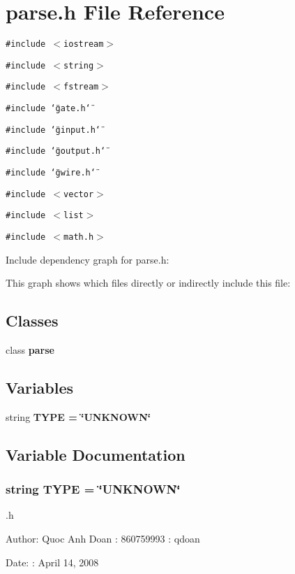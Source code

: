 \section{parse.h File Reference}
\label{parse_8h}
{\tt \#include $<$iostream$>$}\par
{\tt \#include $<$string$>$}\par
{\tt \#include $<$fstream$>$}\par
{\tt \#include \char`\"{}gate.h\char`\"{}}\par
{\tt \#include \char`\"{}ginput.h\char`\"{}}\par
{\tt \#include \char`\"{}goutput.h\char`\"{}}\par
{\tt \#include \char`\"{}gwire.h\char`\"{}}\par
{\tt \#include $<$vector$>$}\par
{\tt \#include $<$list$>$}\par
{\tt \#include $<$math.h$>$}\par


Include dependency graph for parse.h:

This graph shows which files directly or indirectly include this file:\subsection*{Classes}
\begin{CompactItemize}
\item 
class \bf{parse}
\end{CompactItemize}
\subsection*{Variables}
\begin{CompactItemize}
\item 
string \bf{TYPE} = \char`\"{}UNKNOWN\char`\"{}
\end{CompactItemize}


\subsection{Variable Documentation}
\subsubsection{\setlength{\rightskip}{0pt plus 5cm}string \bf{TYPE} = \char`\"{}UNKNOWN\char`\"{}}\label{parse_8h_402f376e2e42b6cbceaf68a8b88d7fbe}


.h \begin{Desc}
\item[Author:]Quoc Anh Doan : 860759993 : qdoan \end{Desc}
\begin{Desc}
\item[Date:]: April 14, 2008 \end{Desc}
